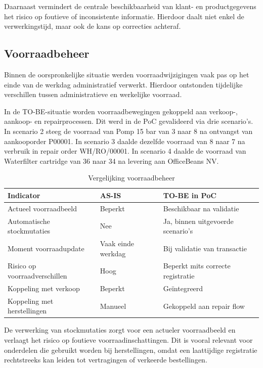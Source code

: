 Daarnaast vermindert de centrale beschikbaarheid van klant- en productgegevens het risico op foutieve of inconsistente informatie. Hierdoor daalt niet enkel de verwerkingstijd, maar ook de kans op correcties achteraf.

\subsection{Voorraadbeheer}

Binnen de oorspronkelijke situatie werden voorraadwijzigingen vaak pas op het einde van de werkdag administratief verwerkt. Hierdoor ontstonden tijdelijke verschillen tussen administratieve en werkelijke voorraad.

In de TO-BE-situatie worden voorraadbewegingen gekoppeld aan verkoop-, aankoop- en repairprocessen. Dit werd in de PoC gevalideerd via drie scenario's. In scenario 2 steeg de voorraad van Pomp 15 bar van 3 naar 8 na ontvangst van aankooporder P00001. In scenario 3 daalde dezelfde voorraad van 8 naar 7 na verbruik in repair order WH/RO/00001. In scenario 4 daalde de voorraad van Waterfilter cartridge van 36 naar 34 na levering aan OfficeBeans NV.

\begin{table}[H]
\centering
\caption{Vergelijking voorraadbeheer}
\label{tab:voorraadvergelijking}
\begin{tabular}{|p{5cm}|p{3cm}|p{3cm}|}
\hline
\textbf{Indicator} & \textbf{AS-IS} & \textbf{TO-BE in PoC} \\
\hline
Actueel voorraadbeeld & Beperkt & Beschikbaar na validatie \\
\hline
Automatische stockmutaties & Nee & Ja, binnen uitgevoerde scenario's \\
\hline
Moment voorraadupdate & Vaak einde werkdag & Bij validatie van transactie \\
\hline
Risico op voorraadverschillen & Hoog & Beperkt mits correcte registratie \\
\hline
Koppeling met verkoop & Beperkt & Geïntegreerd \\
\hline
Koppeling met herstellingen & Manueel & Gekoppeld aan repair flow \\
\hline
\end{tabular}
\end{table}

De verwerking van stockmutaties zorgt voor een actueler voorraadbeeld en verlaagt het risico op foutieve voorraadinschattingen. Dit is vooral relevant voor onderdelen die gebruikt worden bij herstellingen, omdat een laattijdige registratie rechtstreeks kan leiden tot vertragingen of verkeerde bestellingen.

